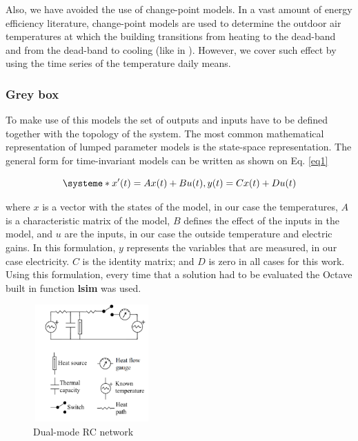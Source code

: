 \documentclass[10pt, conference, compsocconf]{IEEEtran}
\begin{document}
Also, we have avoided the use of change-point models. In a vast amount of energy efficiency literature, change-point models are used to determine the outdoor air temperatures at which the building transitions from heating to the dead-band and from the dead-band to cooling (like in \cite{kissock1998ambient}). However, we cover such effect by using the time series of the temperature daily means. 


\subsubsection{ Grey box}


To make use of this models the set of outputs and inputs have to be defined together with the topology of the system. 
The most common mathematical representation of lumped parameter models is the state-space representation. The general form for time-invariant models can be written as shown on Eq. \ref{eq1}

\begin{equation}\label{eq1}
\systeme*{x'(t)=Ax(t) + Bu(t), y(t)= Cx(t) + Du(t)}
\end{equation}

where $x$ is a vector with the states of the model, in our case the temperatures, $A$ is a characteristic matrix of the model, $B$ defines the effect of the inputs in the model, and $u$ are the inputs, in our case the outside temperature and electric gains. In this formulation, $y$ represents the variables that are measured, in our case electricity. $C$ is the identity matrix; and $D$ is zero in all cases for this work. Using this formulation, every time that a solution had to be evaluated the Octave built in function \textbf{lsim} was used.

\begin{figure}[h]%
\centering
\centerline{\includegraphics[width=4.5cm,height=4.5cm,keepaspectratio]{./pics/figAlf.pdf}}
\caption{Dual-mode RC network}\vspace*{-6pt}
  \label{fig:alf}
\end{figure}
\end{document}
